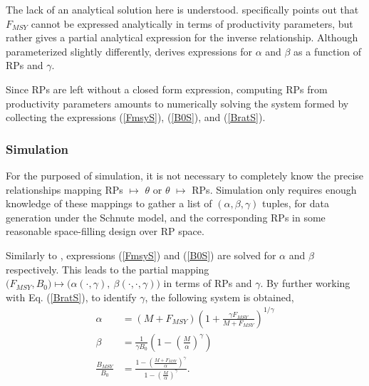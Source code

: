 \documentclass[12pt]{article}
\begin{document}
The lack of an analytical solution here is understood. 
 specifically points out that 
$F_{MSY}$ cannot be expressed analytically in terms of productivity parameters, 
but rather gives a partial analytical expression for the inverse relationship. 
Although parameterized slightly differently,  
derives expressions for $\alpha$ and $\beta$ as a function of RPs and $\gamma$. 

%
Since RPs are left without a closed form expression, computing RPs from 
productivity parameters amounts to numerically solving the system formed by collecting the 
expressions (\ref{FmsyS}), (\ref{B0S}), and (\ref{BratS}).

%
\subsubsection{Simulation \label{sSim}}


%
For the purposed of simulation, it is not necessary to completely know 
the precise relationships mapping RPs $\mapsto$ $\theta$ or $\theta$ $\mapsto$ 
RPs. Simulation only requires enough knowledge of these mappings to gather a list 
of $(\alpha, \beta, \gamma)$ tuples, for data generation under the Schnute model, 
and the corresponding RPs in some reasonable space-filling design over RP space. 

%
Similarly to , expressions %
(\ref{FmsyS}) and (\ref{B0S}) are solved for $\alpha$ and $\beta$ respectively. 
This leads to the partial mapping 
$\big(F_{MSY}, B_0\big) \mapsto \big(\alpha(\cdot, \gamma), ~\beta(\cdot, \cdot, \gamma)\big)$ 
in terms of RPs and $\gamma$. 
By further working with Eq. (\ref{BratS}), to identify $\gamma$, the following 
system is obtained,
%
\begin{align}
\alpha &= (M+F_{MSY})\left(1+\frac{\gamma F_{MSY}}{M+F_{MSY}}\right)^{1/\gamma} \nonumber\\
\beta &= \frac{1}{\gamma B_0}\left(1-\left(\frac{M}{\alpha}\right)^\gamma\right) \label{abgSys}\\
\frac{B_{MSY}}{B_0} &= \frac{1-\left(\frac{M+F_{MSY}}{\alpha}\right)^\gamma}{ 1-\left(\frac{M}{\alpha}\right)^\gamma } \nonumber.
\end{align}
\end{document}
